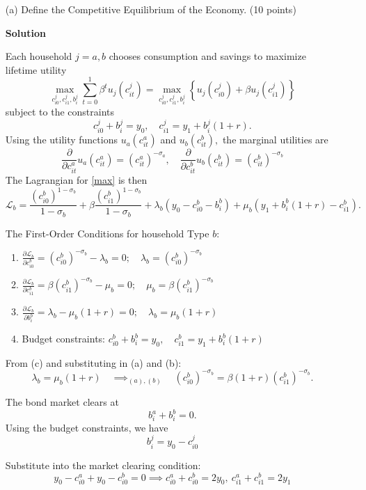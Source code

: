 \documentclass[12pt]{article}
\begin{document}
\begin{enumerate}
    \item[(a)] Define the Competitive Equilibrium of the Economy. (10 points)

    \textbf{Solution}

 Each household $j=a,b$ chooses consumption and savings to maximize lifetime utility
 \begin{equation}\label{max}
     \max_{c_{i0}^j, c_{i1}^j, b_i^j} \sum_{t=0}^{1} \beta^t u_j(c_{it}^j) = \max_{c_{i0}^j, c_{i1}^j, b_i^j} \left\{ u_j(c_{i0}^j) + \beta u_j(c_{i1}^j)   \right\} 
 \end{equation}
    subject to the constraints 
    \[
c_{i0}^j + b_i^j = y_0, \quad c_{i1}^j = y_1 + b_i^j(1 + r).
\]
Using the utility functions $u_a(c_{it}^a)$ and $u_b(c_{it}^b),$ the marginal utilities are 
\[ \frac{\partial }{\partial c_{it}^a}u_a(c_{it}^a) = (c_{it}^a)^{-\sigma_a}, \quad \frac{\partial}{\partial c_{it}^b}  u_b(c_{it}^b) = (c_{it}^b)^{-\sigma_b} \]
    The Lagrangian for \eqref{max} is then 
    \[
\mathcal{L}_b = \frac{(c_{i0}^b)^{1-\sigma_b}}{1-\sigma_b} + \beta \frac{(c_{i1}^b)^{1-\sigma_b}}{1-\sigma_b} + \lambda_b \left(y_0 - c_{i0}^b - b_i^b\right) + \mu_b \left(y_1 + b_i^b(1 + r) - c_{i1}^b\right).
\]

The First-Order Conditions for household Type $b$:
\begin{enumerate}
    \item $\frac{\partial \mathcal{L}_b}{\partial c_{i0}^b} = (c_{i0}^b)^{-\sigma_b} - \lambda_b = 0 ; \quad  \lambda_b = (c_{i0}^b)^{-\sigma_b}$
    \item $\frac{\partial \mathcal{L}_b}{\partial c_{i1}^b} = \beta (c_{i1}^b)^{-\sigma_b} - \mu_b = 0 ; \quad  \mu_b = \beta (c_{i1}^b)^{-\sigma_b}$
    \item $\frac{\partial \mathcal{L}_b}{\partial b_i^b} = \lambda_b - \mu_b(1 + r) = 0 ; \quad  \lambda_b = \mu_b (1 + r)$
    \item Budget constraints: $c_{i0}^b + b_i^b = y_0, \quad c_{i1}^b = y_1 + b_i^b(1 + r)$
\end{enumerate}

From (c) and substituting in (a) and (b):
\[
\lambda_b = \mu_b (1+r) \quad \implies_{(a),(b)} \quad (c_{i0}^b)^{-\sigma_b} = \beta (1 + r) (c_{i1}^b)^{-\sigma_b}.
\]

The bond market clears at 
\[
b_i^a + b_i^b = 0.
\]
Using the budget constraints, we have 
\[
b_i^j = y_0 - c_{i0}^j%
\]

Substitute into the market clearing condition:
\[
y_0 - c_{i0}^a + y_0 - c_{i0}^b = 0 \implies c_{i0}^a + c_{i0}^b = 2y_0, \ c_{i1}^a + c_{i1}^b = 2y_1
\]


\end{enumerate}
\end{document}
